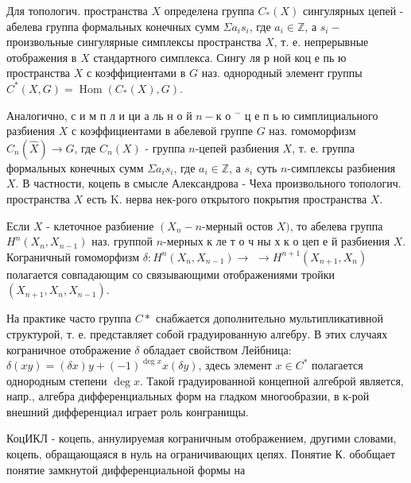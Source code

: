 \documentclass[10pt]{article}
\begin{document}
Для топологич. пространства $X$ определена группа $C_{*}(X)$ сингулярных цепей - абелева группа формальных конечных сумм $\Sigma a_{i} s_{i}$, где $a_{i} \in \mathbb{Z}$, а $s_{i}-$ произвольные сингулярные симплексы пространства $X$, т. е. непрерывные отображения в $X$ стандартного симплекса. Сингу ля р ной коц е пь ю пространства $X$ с коэффициентами в $G$ наз. однородный элемент группы $C^{*}(X, G)=\operatorname{Hom}\left(C_{*}(X), G\right)$.



Аналогично, с и м п л и ци а ль н о й $n-к$ о $^{-}$ ц е п ь ю симплициального разбиения $X$ с коэффициентами в абелевой группе $G$ наз. гомоморфизм $C_{n}(\hat{X}) \rightarrow G$, где $C_{n}(X)$ - группа $n$-цепей разбиения $X$, т. е. группа формальных конечных сумм $\Sigma a_{i} s_{i}$, где $a_{i} \in \mathbb{Z}$, а $s_{i}$ суть $n$-симплексы разбиения $X$. В частности, коцепь в смысле Александрова - Чеха произвольного топологич. пространства $X$ есть $\mathrm{K}$. нерва нек-рого открытого покрытия пространства $X$.



Если $X$ - клеточное разбиение $\left(X_{n}-n\right.$-мерный остов $X)$, то абелева группа $H^{n}\left(X_{n}, X_{n-1}\right)$ наз. группой $n$-мерных к ле т о ч ны х к о цеп е й разбиения $X$. Кограничный гомоморфизм $\delta: H^{n}\left(X_{n}, X_{n-1}\right) \rightarrow$ $\rightarrow H^{n+1}\left(X_{n+1}, X_{n}\right)$ полагается совпадающим со связывающими отображениями тройки $\left(X_{n+1}, X_{n}, X_{n-1}\right)$.



На практике часто группа $C *$ снабжается дополнительно мультипликативной структурой, т. е. представляет собой градуированную алгебру. В этих случаях кограничное отображение $\delta$ обладает свойством Лейбница: $\delta(x y)=(\delta x) y+(-1)^{\operatorname{deg} x} x(\delta y)$, здесь элемент $x \in C^{*}$ полагается однородным степени $\operatorname{deg} x$. Такой градуированной концепной алгеброй является, напр., алгебра дифференциальных форм на гладком многообразии, в к-рой внешний дифференциал играет роль конгранищы.



КоцИКЛ - коцепь, аннулируемая кограничным отображением, другими словами, коцепь, обращающаяся в нуль на ограничивающих цепях. Понятие К. обобщает понятие замкнутой дифференциальной формы на
\end{document}
